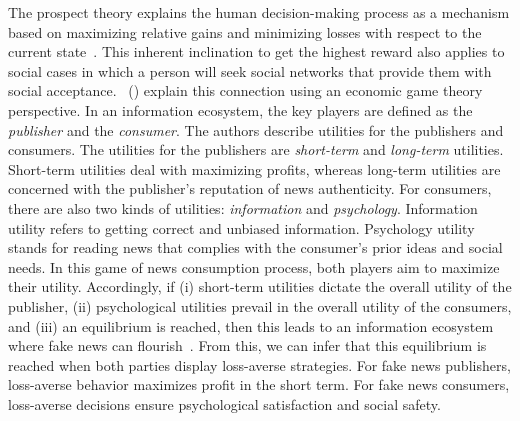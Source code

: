 The prospect theory explains the human decision-making process as a mechanism based on maximizing relative gains and minimizing losses with respect to the current state~\parencite{ProspectTheory_Kahneman, AdvancesInProspectTheory_Kahneman}. This inherent inclination to get the highest reward also applies to social cases in which a person will seek social networks that provide them with social acceptance.~\citeauthor{FakeNewsDetectionOnSocialMediaADataMiningPerspective_Shu} (\citeyear{FakeNewsDetectionOnSocialMediaADataMiningPerspective_Shu}) explain this connection using an economic game theory perspective. In an information ecosystem, the key players are defined as the \emph{publisher} and the \emph{consumer}. The authors describe utilities for the publishers and consumers. The utilities for the publishers are \emph{short-term} and \emph{long-term} utilities. Short-term utilities deal with maximizing profits, whereas long-term utilities are concerned with the publisher's reputation of news authenticity. For consumers, there are also two kinds of utilities: \emph{information} and \emph{psychology}. Information utility refers to getting correct and unbiased information. Psychology utility stands for reading news that complies with the consumer's prior ideas and social needs. In this game of news consumption process, both players aim to maximize their utility. Accordingly, if (i) short-term utilities dictate the overall utility of the publisher, (ii) psychological utilities prevail in the overall utility of the consumers, and (iii) an equilibrium is reached, then this leads to an information ecosystem where fake news can flourish~\parencite{FakeNewsDetectionOnSocialMediaADataMiningPerspective_Shu}. From this, we can infer that this equilibrium is reached when both parties display loss-averse strategies. For fake news publishers, loss-averse behavior maximizes profit in the short term. For fake news consumers, loss-averse decisions ensure psychological satisfaction and social safety.\\
